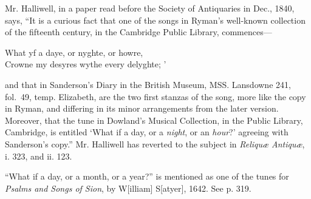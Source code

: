 Mr. Halliwell, in a paper read before the Society of Antiquaries in Dec., 1840,
says, “It is a curious fact that one of the songs in Ryman’s well-known collection
of the fifteenth century, in the Cambridge Public Library, commences—
\settowidth{\versewidth}{Crowne my desyres wythe every delyghte; ’}
\begin{scverse}
What yf a daye, or nyghte, or howre,\\
Crowne my desyres wythe every delyghte; ’
\end{scverse}
and that in Sanderson’s Diary in the British Museum, MSS. Lansdowne 241,
fol.~49, temp. Elizabeth, are the two first stanzas of the song, more like the copy
in Ryman, and differing in its minor arrangements from the later version.
Moreover, that the tune in Dowland’s Musical Collection, in the Public Library,
Cambridge, is entitled ‘What if a day, or a \textit{night}, or an \textit{hour}?’ agreeing with
Sanderson’s copy.” Mr. Halliwell has reverted to the subject in \textit{Reliquæ Antiquæ},
i. 323, and ii. 123.
\pagebreak

“What if a day, or a month, or a year?” is mentioned as one of the tunes for
\textit{Psalms and Songs of Sion}, by W[illiam] S[atyer], 1642. See p. 319.



\pagebreak

